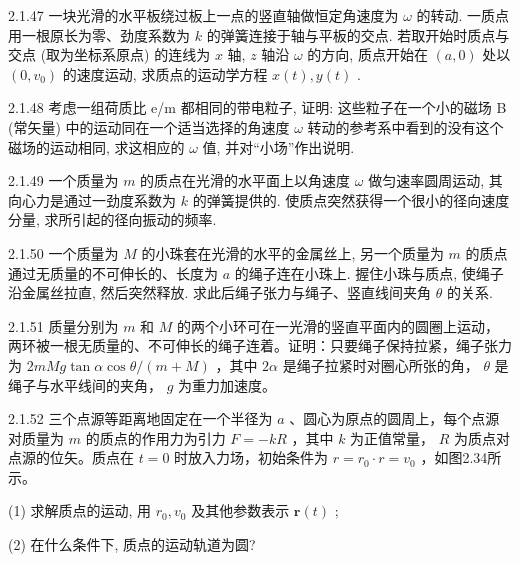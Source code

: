 \begin{problem}{2.1.47}
一块光滑的水平板绕过板上一点的竖直轴做恒定角速度为 $\omega$ 的转动. 一质点用一根原长为零、劲度系数为 $k$ 的弹簧连接于轴与平板的交点. 若取开始时质点与交点 (取为坐标系原点) 的连线为 $x$ 轴, $z$ 轴沿 $\omega$ 的方向, 质点开始在 $(a,0)$ 处以 $(0,v_0)$ 的速度运动, 求质点的运动学方程 $x(t), y(t)$ .
\end{problem}
\clearpage


\begin{problem}{2.1.48}
考虑一组荷质比 e/m 都相同的带电粒子, 证明: 这些粒子在一个小的磁场 B (常矢量) 中的运动同在一个适当选择的角速度 $\omega$ 转动的参考系中看到的没有这个磁场的运动相同, 求这相应的 $\omega$ 值, 并对“小场”作出说明.
\end{problem}
\clearpage


\begin{problem}{2.1.49}
一个质量为 $m$ 的质点在光滑的水平面上以角速度 $\omega$ 做匀速率圆周运动, 其向心力是通过一劲度系数为 $k$ 的弹簧提供的. 使质点突然获得一个很小的径向速度分量, 求所引起的径向振动的频率.
\end{problem}
\clearpage


\begin{problem}{2.1.50}
一个质量为 $M$ 的小珠套在光滑的水平的金属丝上, 另一个质量为 $m$ 的质点通过无质量的不可伸长的、长度为 $a$ 的绳子连在小珠上. 握住小珠与质点, 使绳子沿金属丝拉直, 然后突然释放. 求此后绳子张力与绳子、竖直线间夹角 $\theta$ 的关系.
\end{problem}
\clearpage


\begin{problem}{2.1.51}
质量分别为 $m$ 和 $M$ 的两个小环可在一光滑的竖直平面内的圆圈上运动，两环被一根无质量的、不可伸长的绳子连着。证明：只要绳子保持拉紧，绳子张力为 $2mMg\tan \alpha \cos \theta /(m + M)$ ，其中 $2\alpha$ 是绳子拉紧时对圈心所张的角， $\theta$ 是绳子与水平线间的夹角， $g$ 为重力加速度。
\end{problem}
\clearpage


\begin{problem}{2.1.52}
三个点源等距离地固定在一个半径为 $a$ 、圆心为原点的圆周上，每个点源对质量为 $m$ 的质点的作用力为引力 $F = -kR$ ，其中 $k$ 为正值常量， $R$ 为质点对点源的位矢。质点在 $t = 0$ 时放入力场，初始条件为 $r = r_0 \cdot r = v_0$ ，如图2.34所示。

(1) 求解质点的运动, 用 $r_0, v_0$ 及其他参数表示 $\boldsymbol{r}(t)$ ;

(2) 在什么条件下, 质点的运动轨道为圆?
\begin{center}

\end{center}
\end{problem}
\clearpage



